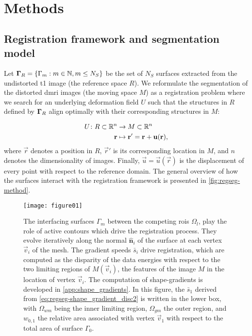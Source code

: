 \section{Methods}\label{sec:regseg-methods}

\subsection{Registration framework and segmentation model}\label{sec:regseg-methods_map}
Let $\boldsymbol{\Gamma}_R = \{\Gamma_m: m \in \mathbb{N}, m \leq N_S\}$ be the set of $N_S$ surfaces
  extracted from the undistorted \gls*{t1} image (the reference space $R$).
We reformulate the segmentation of the distorted \gls*{dmri} images (the moving space $M$)
  as a registration problem where we search for an underlying deformation field $U$ such that
  the structures in $R$ defined by $\boldsymbol{\Gamma}_R$ align optimally with their corresponding
  structures in $M$:

  \begin{align}
  U\colon R \subset \mathbb{R}^n &\to M \subset \mathbb{R}^n \notag\\
  \vec{r} &\mapsto \vec{r}' =\vec{r}+\vec{u}(\vec{r}),
  \label{eq:regseg-transform}
  \end{align}
  where $\vec{r}$ denotes a position in $R$, $\vec{r}'$ is
  its corresponding location in $M$, and $n$ denotes the dimensionality of images.
Finally, $\vec{u} = \vec{u}(\vec{r})$ is the displacement of every point with respect
  to the reference domain.
The general overview of how the surfaces interact with the registration framework
  is presented in \autoref{fig:regseg-method}.

\begin{figure}
  \texttt{[image: figure01]}
  \caption{The interfacing surfaces $\Gamma_m$ between the competing \glspl{roi} $\Omega_l$,
  play the role of active contours which drive the registration process.
  They evolve iteratively along the normal $\hat{\mathbf{n}}_i$ of the surface at each vertex
    $\vec{v}_i$ of the mesh.
  The gradient speeds $\bar{s}_i$ drive registration, which are computed as the disparity of the data
    energies with respect to the two limiting regions of $M(\vec{v}_i)$, the features of the image
    $M$ in the location of vertex $\vec{v}_i$.
  The computation of shape-gradients is developed in \ref{app:shape_gradients}.
  In this figure, the $\bar{s}_1$ derived from \autoref{eq:regseg-shape_gradient_disc2} is 
    written in the lower box, with $\Omega_{wm}$ being the inner limiting region, $\Omega_{gm}$
    the outer region, and $w_{0,1}$ the relative area associated with vertex $\vec{v}_1$
    with respect to the total area of surface $\Gamma_0$.
  }\label{fig:regseg-method}
\end{figure}

